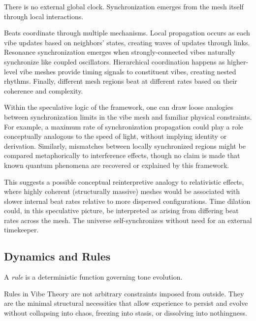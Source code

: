 There is no external global clock. Synchronization emerges from the mesh itself through local interactions.

\begin{proposition}
Beats coordinate through multiple mechanisms. Local propagation occurs as each vibe updates based on neighbors' states, creating waves of updates through links. Resonance synchronization emerges when strongly-connected vibes naturally synchronize like coupled oscillators. Hierarchical coordination happens as higher-level vibe meshes provide timing signals to constituent vibes, creating nested rhythms. Finally, different mesh regions beat at different rates based on their coherence and complexity.
\end{proposition}

\begin{theorem}
Within the speculative logic of the framework, one can draw loose analogies between synchronization limits in the vibe mesh and familiar physical constraints. For example, a maximum rate of synchronization propagation could play a role conceptually analogous to the speed of light, without implying identity or derivation. Similarly, mismatches between locally synchronized regions might be compared metaphorically to interference effects, though no claim is made that known quantum phenomena are recovered or explained by this framework.
\end{theorem}

This suggests a possible conceptual reinterpretive analogy to relativistic effects, where highly coherent (structurally massive) meshes would be associated with slower internal beat rates relative to more dispersed configurations. Time dilation could, in this speculative picture, be interpreted as arising from differing beat rates across the mesh. The universe self-synchronizes without need for an external timekeeper.

\subsection{Dynamics and Rules}

\begin{definition}[Rule]
A \emph{rule} is a deterministic function governing tone evolution.
\end{definition}

Rules in Vibe Theory are not arbitrary constraints imposed from outside. They are the minimal structural necessities that allow experience to persist and evolve without collapsing into chaos, freezing into stasis, or dissolving into nothingness.

